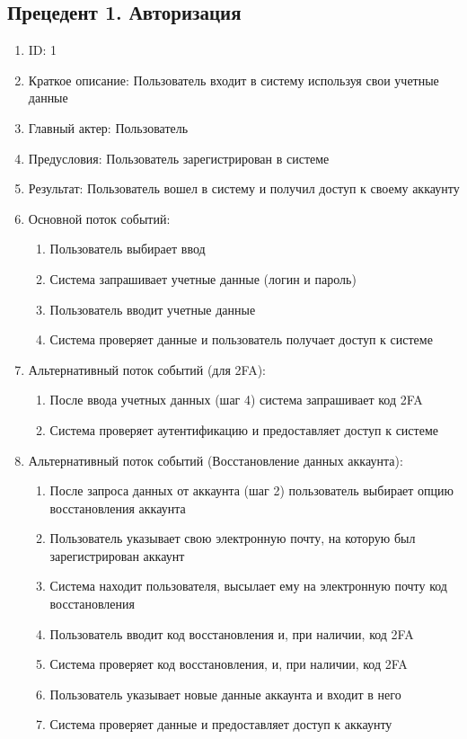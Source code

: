 \documentclass{article}
\begin{document}
\subsection{Прецедент 1. Авторизация}
\begin{enumerate}
    \item ID: 1
    \item Краткое описание: Пользователь входит в систему используя свои учетные данные
    \item Главный актер: Пользователь
    \item Предусловия: Пользователь зарегистрирован в системе
    \item Результат: Пользователь вошел в систему и получил доступ к своему аккаунту
    \item Основной поток событий:
    \begin{enumerate}
            \item Пользователь выбирает ввод
            \item Система запрашивает учетные данные (логин и пароль)
            \item Пользователь вводит учетные данные
            \item Система проверяет данные и пользователь получает доступ к системе
    \end{enumerate}
    \item Альтернативный поток событий (для 2FA):
    \begin{enumerate}
            \item После ввода учетных данных (шаг 4) система запрашивает код 2FA
            \item Система проверяет аутентификацию и предоставляет доступ к системе
    \end{enumerate}
    \item Альтернативный поток событий (Восстановление данных аккаунта):
    \begin{enumerate}
            \item После запроса данных от аккаунта (шаг 2) пользователь выбирает опцию восстановления аккаунта
            \item Пользователь указывает свою электронную почту, на которую был зарегистрирован аккаунт
            \item Система находит пользователя, высылает ему на электронную почту код восстановления
            \item Пользователь вводит код восстановления и, при наличии, код 2FA
            \item Система проверяет код восстановления, и, при наличии, код 2FA
            \item Пользователь указывает новые данные аккаунта и входит в него
            \item Система проверяет данные и предоставляет доступ к аккаунту
    \end{enumerate}
\end{enumerate}
\end{document}
